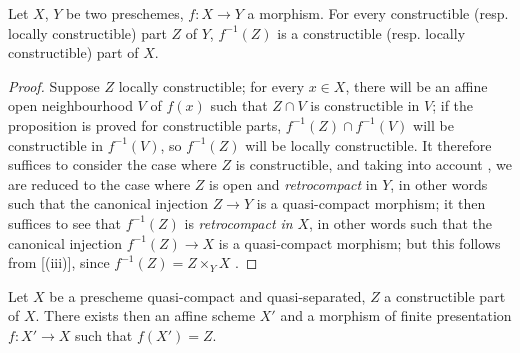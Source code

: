 \begin{proposition}[1.8.2]
\label{IV.1.8.2}
Let $X$, $Y$ be two preschemes, $f:X\to Y$ a morphism.
For every constructible (resp. locally constructible) part $Z$ of $Y$, $f^{-1}(Z)$ is a constructible (resp. locally constructible) part of $X$.
\end{proposition}

\begin{proof}
Suppose $Z$ locally constructible; for every $x\in X$, there will be an affine open neighbourhood $V$ of $f(x)$ such that $Z\cap V$ is constructible in $V$; if the proposition is proved for constructible parts, $f^{-1}(Z)\cap f^{-1}(V)$ will be constructible in $f^{-1}(V)$, so $f^{-1}(Z)$ will be locally constructible.
It therefore suffices to consider the case where $Z$ is constructible, and taking into account , we are reduced to the case where $Z$ is open and \emph{retrocompact} in $Y$, in other words such that the canonical injection $Z\to Y$ is a quasi-compact morphism; it then suffices to see that $f^{-1}(Z)$ is \emph{retrocompact in} $X$, in other words such that the canonical injection $f^{-1}(Z)\to X$ is a quasi-compact morphism; but this follows from [(iii)], since $f^{-1}(Z)=Z\times_Y X$ .
\end{proof}

\begin{lemma}[1.8.3]
\label{IV.1.8.3}
Let $X$ be a prescheme quasi-compact and quasi-separated, $Z$ a constructible part of $X$.
There exists then an affine scheme $X'$ and a morphism of finite presentation $f:X'\to X$ such that $f(X')=Z$.
\end{lemma}

